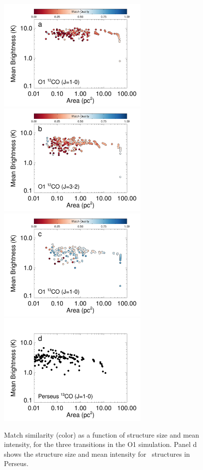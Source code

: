 \begin{figure}[htbp]
\includegraphics[width=2.9in, trim = 0 .53in 0 0, clip]{figures/stella_dss_co10}\hfill
\includegraphics[width=2.9in, trim = 0 .53in 0 .85in, clip]{figures/stella_dss_co32}
\includegraphics[width=2.9in, trim = 0 0 0 .85in, clip]{figures/stella_dss_13co}\hfill
\includegraphics[width=2.9in, trim = 0 0 0 .85in, clip]{figures/per_dss_13co}

\caption{Match similarity (color) as a function of structure size and mean intensity, for the three transitions in the O1 simulation.
Panel d shows the structure size and mean intensity for \coc\, structures in Perseus.}

\label{fig:sim_transition}
\end{figure}

